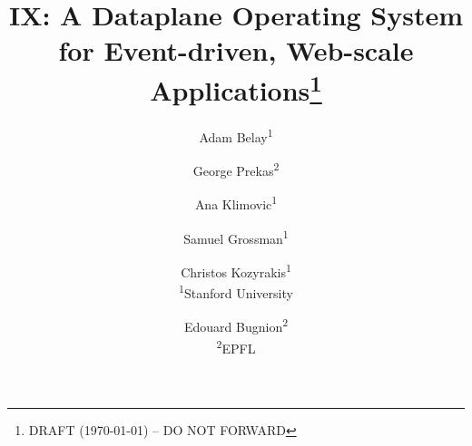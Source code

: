 \documentclass[10pt,twocolumn]{article}
\newif\ifcomments
\begin{document}
\title{\bf IX: A Dataplane Operating System for \break Event-driven, Web-scale Applications\footnote{DRAFT (\today) -- DO NOT FORWARD}}

\author{Adam Belay\textsuperscript{1} \and 
  George Prekas\textsuperscript{2} \and 
  Ana Klimovic\textsuperscript{1} \and 
  Samuel Grossman\textsuperscript{1} \and
  Christos Kozyrakis\textsuperscript{1}\vspace*{5pt}\\\textsuperscript{1}Stanford
  University \and
  Edouard Bugnion\textsuperscript{2}\vspace*{5pt}\\\textsuperscript{2}EPFL}

 

\date{}
\maketitle
\thispagestyle{empty}














 

%

\end{document}
